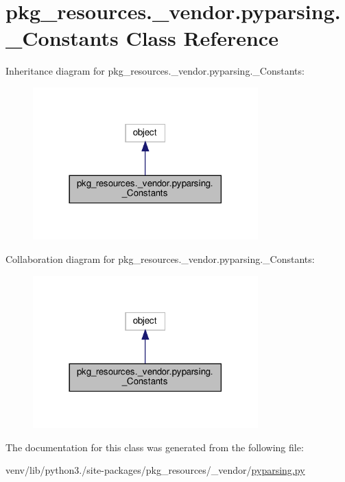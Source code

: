 \hypertarget{classpkg__resources_1_1__vendor_1_1pyparsing_1_1__Constants}{}\section{pkg\+\_\+resources.\+\_\+vendor.\+pyparsing.\+\_\+\+Constants Class Reference}
\label{classpkg__resources_1_1__vendor_1_1pyparsing_1_1__Constants}


Inheritance diagram for pkg\+\_\+resources.\+\_\+vendor.\+pyparsing.\+\_\+\+Constants\+:
\nopagebreak
\begin{figure}[H]
\begin{center}
\leavevmode
\includegraphics[width=246pt]{classpkg__resources_1_1__vendor_1_1pyparsing_1_1__Constants__inherit__graph}
\end{center}
\end{figure}


Collaboration diagram for pkg\+\_\+resources.\+\_\+vendor.\+pyparsing.\+\_\+\+Constants\+:
\nopagebreak
\begin{figure}[H]
\begin{center}
\leavevmode
\includegraphics[width=246pt]{classpkg__resources_1_1__vendor_1_1pyparsing_1_1__Constants__coll__graph}
\end{center}
\end{figure}


The documentation for this class was generated from the following file\+:\begin{DoxyCompactItemize}
\item 
venv/lib/python3./site-\/packages/pkg\+\_\+resources/\+\_\+vendor/\hyperlink{pkg__resources_2__vendor_2pyparsing_8py}{pyparsing.\+py}\end{DoxyCompactItemize}
